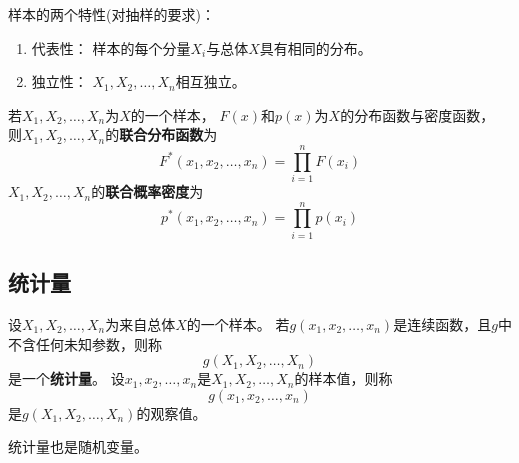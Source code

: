 样本的两个特性(对抽样的要求)：
\begin{enumerate}
  \item 代表性：
  样本的每个分量$X_i$与总体$X$具有相同的分布。
  \item 独立性：
  $X_1,X_2,\dots,X_n$相互独立。
\end{enumerate}

\begin{definition}[样本联合分布/密度]
  若$X_1,X_2,\dots,X_n$为$X$的一个样本，
  $F(x)$和$p(x)$为$X$的分布函数与密度函数，
  则$X_1,X_2,\dots,X_n$的\textbf{联合分布函数}为
  \begin{displaymath}
    F^*(x_1,x_2,\dots,x_n)=\prod_{i=1}^n F(x_i)
  \end{displaymath}
  $X_1,X_2,\dots,X_n$的\textbf{联合概率密度}为
  \begin{displaymath}
    p^*(x_1,x_2,\dots,x_n)=\prod_{i=1}^n p(x_i)
  \end{displaymath}
\end{definition}

\subsection{统计量}
\begin{definition}[统计量]
  设$X_1,X_2,\dots,X_n$为来自总体$X$的一个样本。
  若$g(x_1,x_2,\dots,x_n)$是连续函数，且$g$中不含任何未知参数，则称
  \begin{displaymath}
    g(X_1,X_2,\dots,X_n)
  \end{displaymath}
  是一个\textbf{统计量}。
  设$x_1,x_2,\dots,x_n$是$X_1,X_2,\dots,X_n$的样本值，则称
  \begin{displaymath}
    g(x_1,x_2,\dots,x_n)
  \end{displaymath}
  是$g(X_1,X_2,\dots,X_n)$的观察值。
\end{definition}

\begin{remark}
  统计量也是随机变量。
\end{remark}

